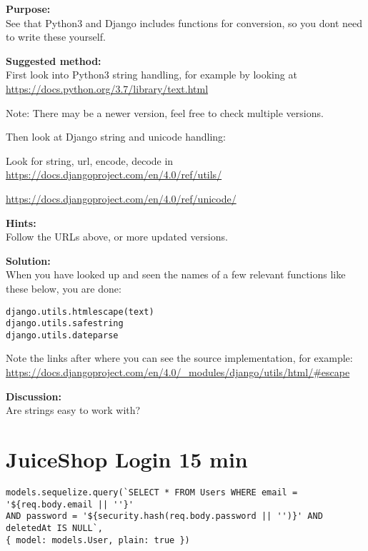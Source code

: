 \documentclass[a4paper,11pt,notitlepage]{report}
\begin{document}
{\bf Purpose:}\\
See that Python3 and Django includes functions for conversion, so you dont need to write these yourself.

{\bf Suggested method:}\\
First look into Python3 string handling, for example by looking at\\
\url{https://docs.python.org/3.7/library/text.html}

Note: There may be a newer version, feel free to check multiple versions.

Then look at Django string and unicode handling:
\begin{list2}
\item Look for string, url, encode, decode in\\ \url{https://docs.djangoproject.com/en/4.0/ref/utils/}
\item \url{https://docs.djangoproject.com/en/4.0/ref/unicode/}
\end{list2}

{\bf Hints:}\\
Follow the URLs above, or more updated versions.

{\bf Solution:}\\
When you have looked up and seen the names of a few relevant functions like these below, you are done:

\begin{alltt}
django.utils.html escape(text)
django.utils.safestring
django.utils.dateparse
\end{alltt}

Note the links after where you can see the source implementation, for example:\\
\url{https://docs.djangoproject.com/en/4.0/_modules/django/utils/html/#escape}


{\bf Discussion:}\\
Are strings easy to work with?




\chapter{JuiceShop Login 15 min}
\label{ex:juice-shop-login}

\begin{verbatim}
models.sequelize.query(`SELECT * FROM Users WHERE email = '${req.body.email || ''}'
AND password = '${security.hash(req.body.password || '')}' AND deletedAt IS NULL`,
{ model: models.User, plain: true })
\end{verbatim}
\end{document}
